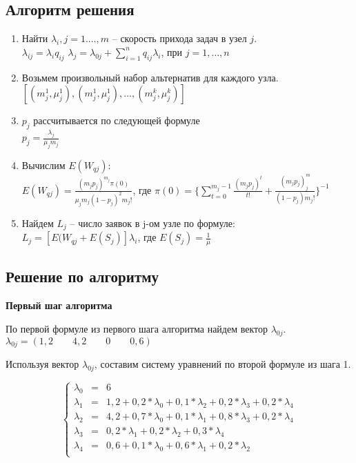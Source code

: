 \subsection{Алгоритм решения}

\begin{enumerate}
	\item Найти $\lambda_i, j = 1. \dots, m$ -- скорость прихода задач в узел $j$.\\
	$\lambda_{ij}=\lambda_i q_{ij}$	
	$\lambda_j = \lambda_{0j} + \sum\limits_{i=1}^n q_{ij}\lambda_i$, при $j=1,\dots,n$\\
	\item Возьмем произвольный набор альтернатив для каждого узла.\\
	$[(m_j^1,\mu_j^1),(m_j^1,\mu_j^1),\dots,(m_j^k,\mu_j^k)]$
	\item $p_j$ рассчитывается по следующей формуле\\
	$p_j = \frac{\lambda_j}{\mu_j m_j}$
	\item Вычислим $E(W_{qj})$:\\
	$E(W_{qj}) = \frac{(m_j p_j)^{m_j} \pi(0)}{\mu_j m_j (1-p_j)^2 m_j!}$, где
	$\pi(0) = \{\sum\limits_{t=0}^{m_j - 1} \frac{(m_j p_j)^t}{t!} + \frac{(m_j p_j) ^ m_j}{(1-p_j)m_j!}  \}^{-1}$
	\item Найдем $L_j$ -- число заявок в j-ом узле по формуле:\\
	$L_j = [E(W_{qj} + E(S_j)] \lambda_i$, где $E(S_j)= \frac{1}{\mu}$
\end{enumerate}

\subsection{Решение по алгоритму}

\textbf{Первый шаг алгоритма}

По первой формуле из первого шага алгоритма найдем вектор $\lambda_{0j}$.\\
$\lambda_{0j}= (1,2 \qquad 4,2 \qquad 0 \qquad 0,6)$

Используя вектор $\lambda_{0j}$, составим систему уравнений по второй формуле из шага 1.

$$
\left\{
	\begin{aligned}
	\lambda_0 &= & 6\\
	\lambda_1 &= & 1,2 + 0,2 * \lambda_0 +0,1 * \lambda_2 + 0,2 * \lambda_3 + 0,2 * \lambda_4\\
	\lambda_2 &= & 4,2 + 0,7* \lambda_0 + 0,1 * \lambda_1 +0,8 * \lambda_3 +0,2 * \lambda_4\\
	\lambda_3 &= & 0,2 * \lambda_1 +0,2 * \lambda_2 +0,3  * \lambda_4\\
	\lambda_4 &= & 0,6 + 0,1 * \lambda_0 + 0,6 * \lambda_1 + 0,2 * \lambda_2\\
	\end{aligned}
\right.
$$


